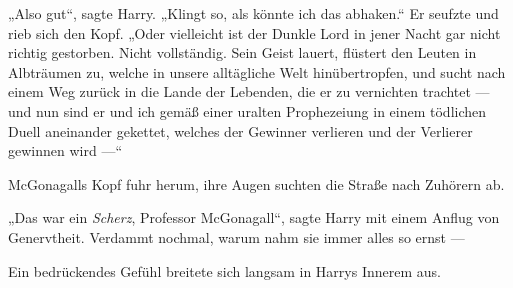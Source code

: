 „Also gut“, sagte Harry.
„Klingt so, als könnte ich das abhaken.“ Er seufzte und rieb sich den Kopf.
„Oder vielleicht ist der Dunkle Lord in jener Nacht gar nicht richtig gestorben. Nicht vollständig. Sein Geist lauert, flüstert den Leuten in Albträumen zu, welche in unsere alltägliche Welt hinübertropfen, und sucht nach einem Weg zurück in die Lande der Lebenden, die er zu vernichten trachtet — und nun sind er und ich gemäß einer uralten Prophezeiung in einem tödlichen Duell aneinander gekettet, welches der Gewinner verlieren und der Verlierer gewinnen wird —“

McGonagalls Kopf fuhr herum, ihre Augen suchten die Straße nach Zuhörern ab.

„Das war ein \emph{Scherz}, Professor McGonagall“, sagte Harry mit einem Anflug von Genervtheit. Verdammt nochmal, warum nahm sie immer alles so ernst —

Ein bedrückendes Gefühl breitete sich langsam in Harrys Innerem aus.

